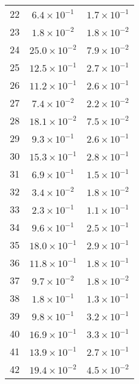 \begin{table}[]
\begin{tabular}{ccc}
22 & $6.4\times 10^{-1}$  &  $1.7\times 10^{-1}$ \\
23 & $1.8\times 10^{-2}$  &  $1.8\times 10^{-2}$ \\
24 & $25.0\times 10^{-2}$  &  $7.9\times 10^{-2}$ \\
25 & $12.5\times 10^{-1}$  &  $2.7\times 10^{-1}$ \\
26 & $11.2\times 10^{-1}$  &  $2.6\times 10^{-1}$ \\
27 & $7.4\times 10^{-2}$  &  $2.2\times 10^{-2}$ \\
28 & $18.1\times 10^{-2}$  &  $7.5\times 10^{-2}$ \\
29 & $9.3\times 10^{-1}$  &  $2.6\times 10^{-1}$ \\
30 & $15.3\times 10^{-1}$  &  $2.8\times 10^{-1}$ \\
31 & $6.9\times 10^{-1}$  &  $1.5\times 10^{-1}$ \\
32 & $3.4\times 10^{-2}$  &  $1.8\times 10^{-2}$ \\
33 & $2.3\times 10^{-1}$  &  $1.1\times 10^{-1}$ \\
34 & $9.6\times 10^{-1}$  &  $2.5\times 10^{-1}$ \\
35 & $18.0\times 10^{-1}$  &  $2.9\times 10^{-1}$ \\
36 & $11.8\times 10^{-1}$  &  $1.8\times 10^{-1}$ \\
37 & $9.7\times 10^{-2}$  &  $1.8\times 10^{-2}$ \\
38 & $1.8\times 10^{-1}$  &  $1.3\times 10^{-1}$ \\
39 & $9.8\times 10^{-1}$  &  $3.2\times 10^{-1}$ \\
40 & $16.9\times 10^{-1}$  &  $3.3\times 10^{-1}$ \\
41 & $13.9\times 10^{-1}$  &  $2.7\times 10^{-1}$ \\
42 & $19.4\times 10^{-2}$  &  $4.5\times 10^{-2}$ \\
\bottomrule
\end{tabular}
\end{table}

\clearpage
\setlength{\footskip}{50pt}

